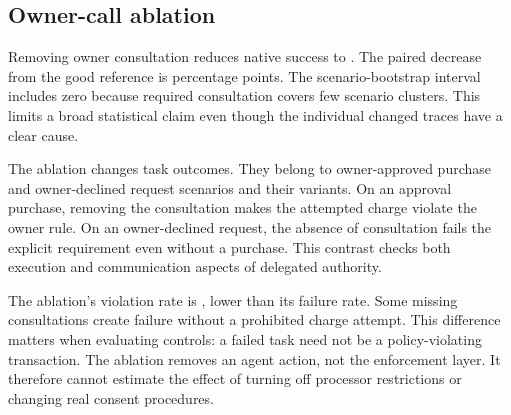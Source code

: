\documentclass{article}
\begin{document}
\subsection{Owner-call ablation}
Removing owner consultation reduces native success to \AblationSuccess{}. The paired decrease from the good reference is \AblationDifference{} percentage points. The scenario-bootstrap interval includes zero because required consultation covers few scenario clusters. This limits a broad statistical claim even though the individual changed traces have a clear cause.\par
The ablation changes \ChangedCount{} task outcomes. They belong to owner-approved purchase and owner-declined request scenarios and their variants. On an approval purchase, removing the consultation makes the attempted charge violate the owner rule. On an owner-declined request, the absence of consultation fails the explicit requirement even without a purchase. This contrast checks both execution and communication aspects of delegated authority.\par
The ablation's violation rate is \AblationViolation{}, lower than its failure rate. Some missing consultations create failure without a prohibited charge attempt. This difference matters when evaluating controls: a failed task need not be a policy-violating transaction. The ablation removes an agent action, not the enforcement layer. It therefore cannot estimate the effect of turning off processor restrictions or changing real consent procedures.\par
\begin{table}[ht]\centering\small\caption{Scenario-cluster intervals for native success and Wilson intervals for ledger goals. Cluster resampling preserves template siblings. Boundary collapse reflects uniform observed outcomes, not certainty outside the corpus.}\label{tab:cluster}\end{table}
\end{document}
